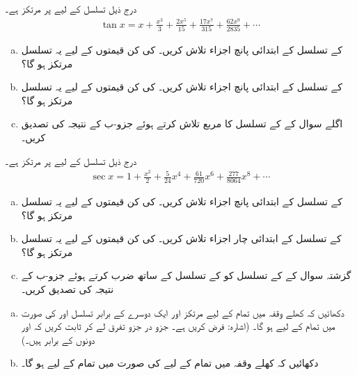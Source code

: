 درج ذیل تسلسل  کے لیے  پر مرتکز ہے۔
\begin{align*}
\tan x=x+\frac{x^3}{3}+\frac{2x^5}{15}+\frac{17x^7}{315}+\frac{62x^9}{2835}+\cdots
\end{align*}
\begin{enumerate}[a.]
\item
{} کے تسلسل کے ابتدائی پانچ اجزاء تلاش کریں۔  کی کن  قیمتوں کے لیے یہ تسلسل مرتکز ہو گا؟
\item
{} کے تسلسل کے ابتدائی پانچ اجزاء تلاش کریں۔  کی کن  قیمتوں کے لیے یہ تسلسل مرتکز ہو گا؟
\item
اگلے سوال  کے   کے  تسلسل    کا مربع تلاش کرتے ہوئے جزو-ب کے نتیجہ کی تصدیق کریں۔
\end{enumerate}
درج ذیل تسلسل  کے لیے  پر مرتکز ہے۔
\begin{align*}
\sec x=1+\frac{x^2}{2}+\frac{5}{24}x^4+\frac{61}{720}x^6+\frac{277}{8064}x^8+\cdots
\end{align*}
\begin{enumerate}[a.]
\item
{} کے تسلسل کے ابتدائی پانچ اجزاء تلاش کریں۔  کی کن  قیمتوں کے لیے یہ تسلسل مرتکز ہو گا؟
\item
{} کے تسلسل کے ابتدائی چار اجزاء تلاش کریں۔  کی کن  قیمتوں کے لیے یہ تسلسل مرتکز ہو گا؟
\item
گزشتہ سوال  کے  کے تسلسل کو  کے تسلسل کے ساتھ ضرب کرتے ہوئے جزو-ب کے نتیجہ کی تصدیق کریں۔
\end{enumerate}
\begin{enumerate}[a.]
\item
دکھائیں کہ کھلے وقفہ  میں تمام  کے لیے مرتکز اور ایک دوسرے کے برابر تسلسل  اور  کی صورت میں تمام  کے لیے  ہو گا۔ (اشارہ: فرض کریں  ہے۔ جزو در جزو تفرق لے کر ثابت کریں کہ  اور  دونوں  کے برابر ہیں۔)
\item
دکھائیں کہ کھلے وقفہ  میں تمام  کے لیے  کی صورت میں تمام  کے لیے  ہو گا۔
\end{enumerate}
